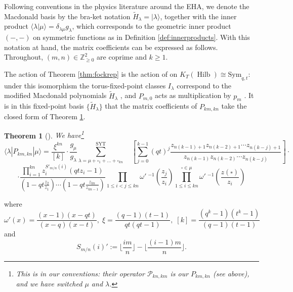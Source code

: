 \documentclass{amsart}
\numberwithin{equation}{section}
\newtheorem{theorem}[lemma]{Theorem}%
\theoremstyle{definition}
\def\Sym{{\mathrm{Sym}}}
\DeclareMathOperator{\Hilb}{Hilb}
\newcommand{\tH}{\widetilde{H}}
\newcommand{\cE}{\mathcal{E}}
\newcommand{\Z}{{\mathbb Z}}
\newcommand{\SYT}{\mathrm{SYT}}
\begin{document}
Following conventions in the physics literature around the EHA, we denote the Macdonald basis by the bra-ket notation $\tH_\lambda=|\lambda\rangle$, together with the inner product $\langle \lambda|\mu\rangle=\delta_{\lambda\mu}g_\lambda$, which corresponds to the geometric inner product $(-,-)$ on symmetric functions as in Definition \ref{def:innerproducts}. With this notation at hand, the matrix coefficients can be expressed as follows. Throughout, $(m,n) \in \Z_{\geq 0}^2$ are coprime and $k \geq 1$.



The action of Theorem \ref{thm:fockrep} is the action of \cite{SVKTheory, FT} on $K_T(\Hilb) \cong \Sym_{q,t}$: under this isomorphism the torus-fixed-point classes $I_\lambda$ correspond to the modified Macdonald polynomials $\tH_\lambda$ \cite[Thm.~4.2]{GN}, and $P_{m,0}$ acts as multiplication by $p_m$ \cite[Rmk.~4.3]{GN}. It is in this fixed-point basis $\{\tH_\lambda\}$ that the matrix coefficients of $P_{km,kn}$ take the closed form of Theorem \ref{thm:matrixcoeff}.

\begin{theorem}[]
\label{thm:matrixcoeff}
We have\footnote{This is \cite[Eq.~(37)]{GN} in our conventions: their operator $\mathcal{P}_{kn,km}$ is our $P_{km,kn}$ (see above), and we have switched $\mu$ and $\lambda$.}
$$
\langle \lambda|P_{km,kn}|\mu\rangle=\frac {\xi^{kn}}{[k]} \cdot \frac{g_\mu}{g_\lambda} 
\sum^{\SYT}_{\lambda = \mu + \square_1 + \ldots + \square_{kn}} \quad \left[\sum_{j=0}^{k-1}  (qt)^{j} \frac {z_{n(k-1)+1}z_{n(k-2)+1}\cdots z_{n(k-j)+1}}{z_{n(k-1)}z_{n(k-2)}\cdots z_{n(k-j)}} \right] \cdot 
$$
$$\cdot \frac {\prod_{i=1}^{kn} z_i^{S'_{m/n}(i)} (qt z_i - 1 ) }{\left(1 - qt\frac {z_2}{z_1}\right)\cdots \left(1 - qt\frac {z_{kn}}{z_{kn-1}} \right)} \prod_{1\leq i<j \leq kn} \omega'~^{-1} \left(\frac {z_j}{z_i} \right)  \prod_{1\leq i \leq kn}^{\square \in \mu} \omega'~^{-1} \left(\frac {z(\square)}{z_i} \right) $$
\end{theorem}
\noindent
where $$\omega'\left(x\right)=\frac{(x-1)(x-qt)}{(x-q)(x-t)},\; \xi=\frac{(q-1)(t-1)}{qt(qt-1)},\; [k]=\frac{(q^k-1)(t^k-1)}{(q-1)(t-1)}$$ and $$S_{m/n}(i)':=\lfloor \frac{im}{n}\rfloor -\lfloor \frac{(i-1)m}{n}\rfloor.$$
\end{document}

